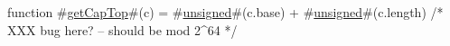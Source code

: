 function #\hyperref[zgetCapTop]{getCapTop}#(c) = #\hyperref[zunsigned]{unsigned}#(c.base) + #\hyperref[zunsigned]{unsigned}#(c.length) /* XXX bug here? -- should be mod 2^64 */
